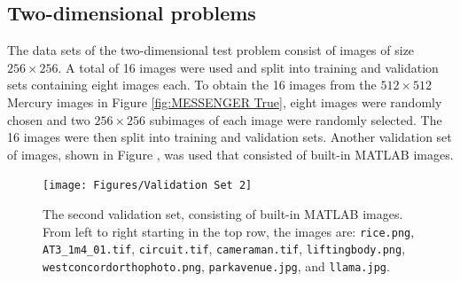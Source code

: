 \documentclass[12pt]{article}
\begin{document}
\subsection{Two-dimensional problems} \label{sec:2D}

The data sets of the two-dimensional test problem consist of images of size $256 \times 256$. A total of 16 images were used and split into training and validation sets containing eight images each. To obtain the 16 images from the $512 \times 512$ Mercury images in Figure \ref{fig:MESSENGER True}, eight images were randomly chosen and two $256 \times 256$ subimages of each image were randomly selected. The 16 images were then split into training and validation sets. Another validation set of images, shown in Figure , was used that consisted of built-in MATLAB images.

\begin{figure}[ht]
\texttt{[image: Figures/Validation Set 2]}
\caption{The second validation set, consisting of built-in MATLAB images. From left to right starting in the top row, the images are: \texttt{rice.png}, \texttt{AT3\_1m4\_01.tif}, \texttt{circuit.tif}, \texttt{cameraman.tif}, \texttt{liftingbody.png}, \texttt{westconcordorthophoto.png}, \texttt{parkavenue.jpg}, and \texttt{llama.jpg}.}
\label{fig:Validation Set 2}
\end{figure}
\end{document}
